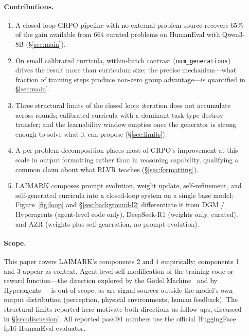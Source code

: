 \documentclass[11pt,a4paper]{article}
\begin{document}
\paragraph{Contributions.}
\begin{enumerate}
    \item A closed-loop GRPO pipeline with no external problem source recovers 65\% of the gain available from 664 curated problems on HumanEval with Qwen3-8B (\S\ref{sec:main}).
    \item On small calibrated curricula, within-batch contrast (\texttt{num\_generations}) drives the result more than curriculum size; the precise mechanism---what fraction of training steps produce non-zero group advantage---is quantified in \S\ref{sec:main}.
    \item Three structural limits of the closed loop: iteration does not accumulate across rounds; calibrated curricula with a dominant task type destroy transfer; and the learnability window empties once the generator is strong enough to solve what it can propose (\S\ref{sec:limits}).
    \item A per-problem decomposition places most of GRPO's improvement at this scale in output formatting rather than in reasoning capability, qualifying a common claim about what RLVR teaches (\S\ref{sec:formatting}).
    \item LAIMARK composes prompt evolution, weight update, self-refinement, and self-generated curricula into a closed-loop system on a single base model; Figure~\ref{fig:loop} and \S\ref{sec:background-l2} differentiate it from DGM / Hyperagents (agent-level code only), DeepSeek-R1 (weights only, curated), and AZR (weights plus self-generation, no prompt evolution).
\end{enumerate}

\paragraph{Scope.}
This paper covers LAIMARK's components 2 and 4 empirically; components 1 and 3 appear as context.
Agent-level self-modification of the training code or reward function---the direction explored by the G{\"o}del Machine~\citep{schmidhuber2003godel} and by Hyperagents~\citep{zhang2026hyperagents}---is out of scope, as are signal sources outside the model's own output distribution (perception, physical environments, human feedback).
The structural limits reported here motivate both directions as follow-ups, discussed in \S\ref{sec:discussion}.
All reported pass@1 numbers use the official HuggingFace fp16 HumanEval evaluator.
\end{document}
